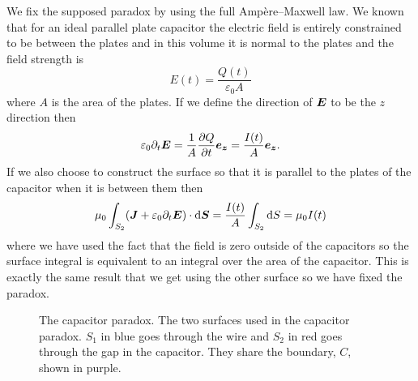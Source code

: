     We fix the supposed paradox by using the full Amp\`ere--Maxwell law.
    We known that for an ideal parallel plate capacitor the electric field is entirely constrained to be between the plates and in this volume it is normal to the plates and the field strength is
    \[E(t) = \frac{Q(t)}{\varepsilon_0 A}\]
    where \(A\) is the area of the plates.
    If we define the direction of \(\bm{E}\) to be the \(z\) direction then
    \[\varepsilon_0\partial_t\bm{E} = \frac{1}{A}\pdv{Q}{t}\bm{e_{z}} = \frac{I(t)}{A}\bm{e_{z}}.\]
    If we also choose to construct the surface so that it is parallel to the plates of the capacitor when it is between them then
    \[\mu_0\int_{S_2}(\bm{J} + \varepsilon_0\partial_t\bm{E})\cdot\dd{\bm{S}} = \frac{I(t)}{A}\int_{S_2}\dd{S} = \mu_0I(t)\]
    where we have used the fact that the field is zero outside of the capacitors so the surface integral is equivalent to an integral over the area of the capacitor.
    This is exactly the same result that we get using the other surface so we have fixed the paradox.
    \begin{figure}[ht]
        \centering
        \caption{The capacitor paradox. The two surfaces used in the capacitor paradox. \(S_1\) in blue goes through the wire and \(S_2\) in red goes through the gap in the capacitor. They share the boundary, \(C\), shown in purple.}
    \end{figure}
    
